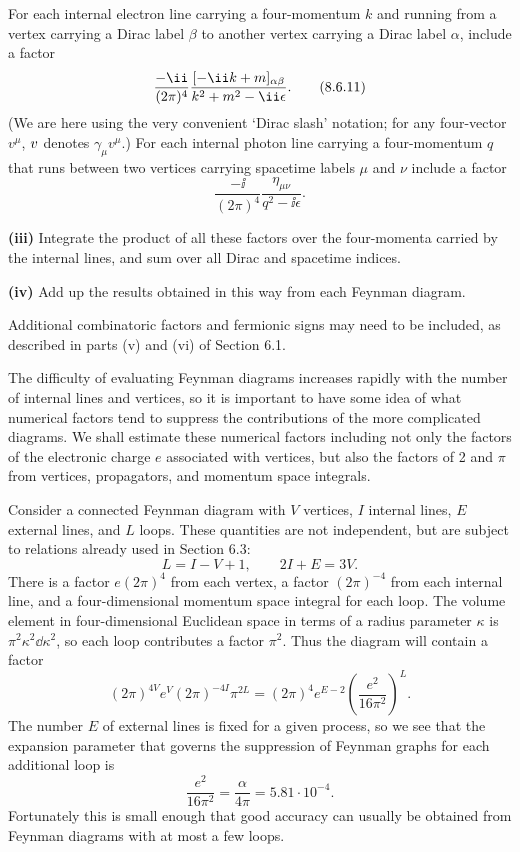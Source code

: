 For each internal electron line carrying a four-momentum $k$ and running from
a vertex carrying a Dirac label $\beta$ to another vertex carrying a Dirac
label $\alpha$, include a factor
\begin{equation}
\frac{-\ii}{(2\pi)^4}
\frac{[-\ii\sl{k}+m]_{\alpha\beta}}{k^2+m^2-\ii\epsilon}.
\tag{8.6.11}\label{eq:8.6.11}
\end{equation}
(We are here using the very convenient `Dirac slash' notation; for any
four-vector $v^\mu$, $\sl{v}$ denotes $\gamma_\mu v^\mu$.) For each
internal photon line carrying a four-momentum $q$ that runs between two
vertices carrying spacetime labels $\mu$ and $\nu$ include a factor
\begin{equation}
\frac{-\ii}{(2\pi)^4}\frac{\eta_{\mu\nu}}{q^2-\ii\epsilon}.
\tag{8.6.12}\label{eq:8.6.12}
\end{equation}

\medskip
\noindent\textbf{(iii)} Integrate the product of all these factors over the
four-momenta carried by the internal lines, and sum over all Dirac and
spacetime indices.

\medskip
\noindent\textbf{(iv)} Add up the results obtained in this way from each
Feynman diagram.

Additional combinatoric factors and fermionic signs may need to be included,
as described in parts (v) and (vi) of Section 6.1.

The difficulty of evaluating Feynman diagrams increases rapidly with the
number of internal lines and vertices, so it is important to have some idea of
what numerical factors tend to suppress the contributions of the more
complicated diagrams. We shall estimate these numerical factors including not
only the factors of the electronic charge $e$ associated with vertices, but
also the factors of 2 and $\pi$ from vertices, propagators, and momentum space
integrals.

Consider a connected Feynman diagram with $V$ vertices, $I$ internal lines,
$E$ external lines, and $L$ loops. These quantities are not independent, but
are subject to relations already used in Section 6.3:
\[
L=I-V+1,\qquad 2I+E=3V.
\]
There is a factor $e(2\pi)^4$ from each vertex, a factor $(2\pi)^{-4}$
from each internal line, and a four-dimensional momentum space integral for
each loop. The volume element in four-dimensional Euclidean space in terms of
a radius parameter $\kappa$ is $\pi^2\kappa^2\dd\kappa^2$, so each loop
contributes a factor $\pi^2$. Thus the diagram will contain a factor
\[
(2\pi)^{4V}e^V(2\pi)^{-4I}\pi^{2L}
=(2\pi)^4e^{E-2}\left(\frac{e^2}{16\pi^2}\right)^L.
\]
The number $E$ of external lines is fixed for a given process, so we see that
the expansion parameter that governs the suppression of Feynman graphs for
each additional loop is
\[
\frac{e^2}{16\pi^2}=\frac{\alpha}{4\pi}=5.81\cdot10^{-4}.
\]
Fortunately this is small enough that good accuracy can usually be obtained
from Feynman diagrams with at most a few loops.

